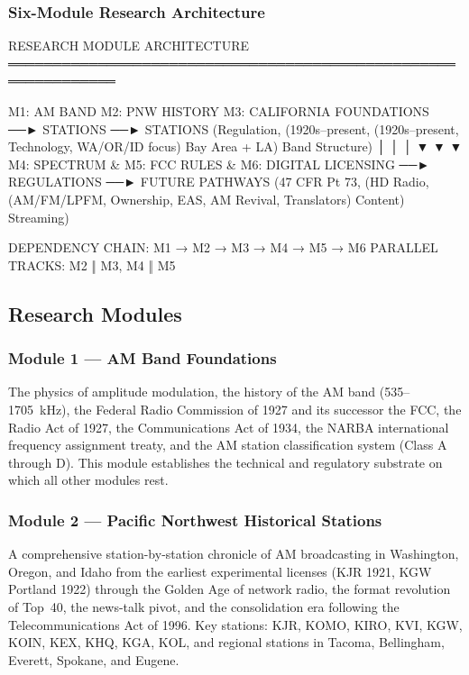 \documentclass[11pt,letterpaper]{article}
\begin{document}
\subsubsection{Six-Module Research Architecture}

\begin{asciibox}
RESEARCH MODULE ARCHITECTURE
══════════════════════════════════════════════════════════════

  M1: AM BAND          M2: PNW HISTORY       M3: CALIFORNIA
  FOUNDATIONS     ──►  STATIONS         ──►  STATIONS
  (Regulation,         (1920s–present,        (1920s–present,
  Technology,          WA/OR/ID focus)        Bay Area + LA)
  Band Structure)
       │                    │                     │
       ▼                    ▼                     ▼
  M4: SPECTRUM &      M5: FCC RULES &       M6: DIGITAL
  LICENSING      ──►  REGULATIONS      ──►  FUTURE
  PATHWAYS             (47 CFR Pt 73,         (HD Radio,
  (AM/FM/LPFM,         Ownership, EAS,        AM Revival,
  Translators)         Content)               Streaming)

  DEPENDENCY CHAIN: M1 → M2 → M3 → M4 → M5 → M6
  PARALLEL TRACKS:  M2 ‖ M3,  M4 ‖ M5
\end{asciibox}

\subsection{Research Modules}

\subsubsection{Module 1 --- AM Band Foundations}
The physics of amplitude modulation, the history of the AM band (535--1705~kHz), the Federal
Radio Commission of 1927 and its successor the FCC, the Radio Act of 1927, the Communications
Act of 1934, the NARBA international frequency assignment treaty, and the AM station classification
system (Class A through D). This module establishes the technical and regulatory substrate on
which all other modules rest.

\subsubsection{Module 2 --- Pacific Northwest Historical Stations}
A comprehensive station-by-station chronicle of AM broadcasting in Washington, Oregon, and Idaho
from the earliest experimental licenses (KJR 1921, KGW Portland 1922) through the Golden Age of
network radio, the format revolution of Top~40, the news-talk pivot, and the consolidation era
following the Telecommunications Act of 1996. Key stations: KJR, KOMO, KIRO, KVI, KGW, KOIN,
KEX, KHQ, KGA, KOL, and regional stations in Tacoma, Bellingham, Everett, Spokane, and Eugene.
\end{document}
